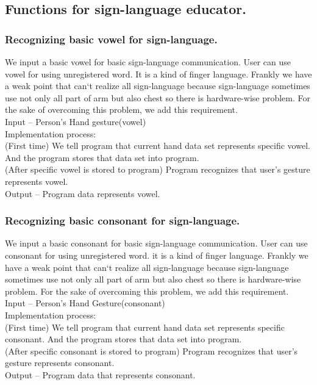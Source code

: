 \documentclass[10pt,journal,compsoc]{IEEEtran}
\begin{document}
\subsection{Functions for sign-language educator.\\}


\subsubsection{Recognizing basic vowel for sign-language.}

We input a basic vowel for basic sign-language communication. User can use vowel for using unregistered word. It is a kind of finger language. Frankly we have a weak point that can`t realize all sign-language because sign-language sometimes use not only all part of arm but also chest so there is hardware-wise problem. For the sake of overcoming this problem, we add this requirement.
\\Input – Person's Hand gesture(vowel)
\\Implementation process:
\\(First time) We tell program that current hand data set represents specific vowel. And the program stores that data set into program.
\\(After specific vowel is stored to program) Program recognizes that user’s gesture represents vowel.
\\Output – Program data represents vowel.

\subsubsection{Recognizing basic consonant for sign-language.}

We input a basic consonant for basic sign-language communication. User can use consonant for using unregistered word. it is a kind of finger language. Frankly we have a weak point that can`t realize all sign-language because sign-language sometimes use not only all part of arm but also chest so there is hardware-wise problem. For the sake of overcoming this problem, we add this requirement.
\\Input – Person's Hand Gesture(consonant)
\\Implementation process:
\\(First time) We tell program that current hand data set represents specific consonant. And the program stores that data set into program.
\\(After specific consonant is stored to program) Program recognizes that user’s gesture represents consonant.
\\Output – Program data that represents consonant.
\end{document}
